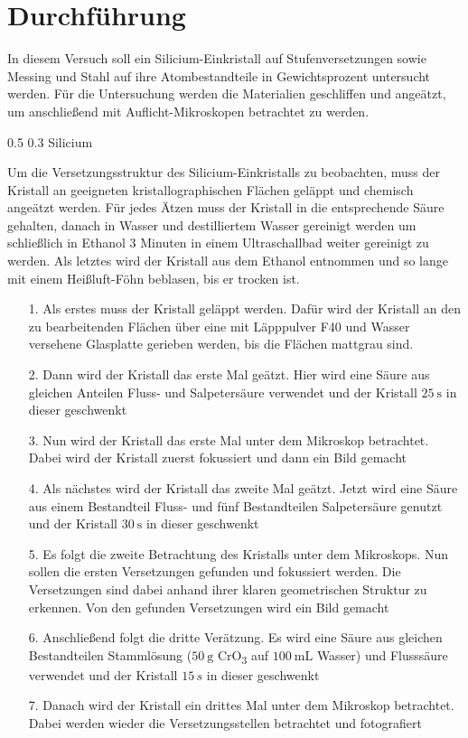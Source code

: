 \documentclass[german, %
parskip=full, %
bibliography=totoc, %
]{scrartcl}
\makeatletter
\renewcommand\subsection{\@startsection 
   {subsection}{2}{0mm}%
   {0.5\baselineskip}%
   {0.3\baselineskip}%
   {\bfseries\sffamily\large}%
   }
\makeatother
\begin{document}
\section{Durchführung}

In diesem Versuch soll ein Silicium-Einkristall auf Stufenversetzungen sowie Messing und Stahl auf ihre Atombestandteile in Gewichtsprozent untersucht werden. Für die Untersuchung werden die Materialien geschliffen und angeätzt, um anschließend mit Auflicht-Mikroskopen betrachtet zu werden.

\subsection{Silicium}

Um die Versetzungsstruktur des Silicium-Einkristalls zu beobachten, muss der Kristall an geeigneten kristallographischen Flächen geläppt und chemisch angeätzt werden. Für jedes Ätzen muss der Kristall in die entsprechende Säure gehalten, danach in Wasser und destilliertem Wasser gereinigt werden um schließlich in Ethanol 3 Minuten in einem Ultraschallbad weiter gereinigt zu werden. Als letztes wird der Kristall aus dem Ethanol entnommen und so lange mit einem Heißluft-Föhn beblasen, bis er trocken ist. 
\begin{itemize}
\item[1.] Als erstes muss der Kristall geläppt werden. Dafür wird der Kristall an den zu bearbeitenden Flächen über eine mit Läpppulver F40 und Wasser versehene Glasplatte gerieben werden, bis die Flächen mattgrau sind.
\item[2.] Dann wird der Kristall das erste Mal geätzt. Hier wird eine Säure aus gleichen Anteilen Fluss- und Salpetersäure verwendet und der Kristall \(\SI{25}{\second}\) in dieser geschwenkt
\item[3.] Nun wird der Kristall das erste Mal unter dem Mikroskop betrachtet. Dabei wird der Kristall zuerst fokussiert und dann ein Bild gemacht
\item[4.] Als nächstes wird der Kristall das zweite Mal geätzt. Jetzt wird eine Säure aus einem Bestandteil Fluss- und fünf Bestandteilen Salpetersäure genutzt und der Kristall \(\SI{30}{\second}\) in dieser geschwenkt
\item[5.] Es folgt die zweite Betrachtung des Kristalls unter dem Mikroskops. Nun sollen die ersten Versetzungen gefunden und fokussiert werden. Die Versetzungen sind dabei anhand ihrer klaren geometrischen Struktur zu erkennen. Von den gefunden Versetzungen wird ein Bild gemacht
\item[6.] Anschließend folgt die dritte Verätzung. Es wird eine Säure aus gleichen Bestandteilen Stammlösung (\(\SI{50}{\gram}\) CrO\textsubscript{3} auf \(\SI{100}{\milli\liter}\) Wasser) und Flusssäure verwendet und der Kristall $15\,s$ in dieser geschwenkt
\item[7.] Danach wird der Kristall ein drittes Mal unter dem Mikroskop betrachtet. Dabei werden wieder die Versetzungsstellen betrachtet und fotografiert
\end{itemize}
\end{document}
